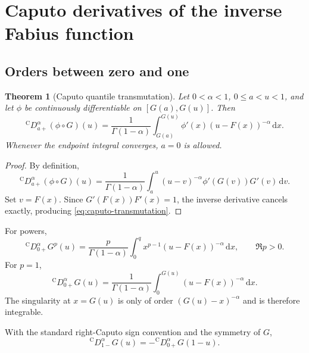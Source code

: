 \documentclass[11pt,oneside]{article}
\newtheorem{theorem}{Theorem}[section]
\theoremstyle{definition}
\theoremstyle{remark}
\newcommand{\dd}{\,\mathrm d}
\newcommand{\Caputo}{\mathrm C}
\begin{document}
\section{Caputo derivatives of the inverse Fabius function}
\label{sec:caputo}

\subsection{Orders between zero and one}

\begin{theorem}[Caputo quantile transmutation]
\label{thm:caputo-transmutation}
Let $0<\alpha<1$, $0\le a<u<1$, and let $\phi$ be continuously
differentiable on $[G(a),G(u)]$.  Then
\begin{equation}
 {}^{\Caputo}D_{a+}^{\alpha}(\phi\circ G)(u)
 =\frac1{\Gamma(1-\alpha)}
  \int_{G(a)}^{G(u)}
  \phi'(x)(u-F(x))^{-\alpha}\dd x.
 \label{eq:caputo-transmutation}
\end{equation}
Whenever the endpoint integral converges, $a=0$ is allowed.
\end{theorem}

\begin{proof}
By definition,
\begin{equation}
 {}^{\Caputo}D_{a+}^{\alpha}(\phi\circ G)(u)
 =\frac1{\Gamma(1-\alpha)}
  \int_a^u(u-v)^{-\alpha}\phi'(G(v))G'(v)\dd v.
\end{equation}
Set $v=F(x)$.  Since $G'(F(x))F'(x)=1$, the inverse derivative cancels
exactly, producing \eqref{eq:caputo-transmutation}.
\end{proof}

For powers,
\begin{equation}
 {}^{\Caputo}D_{0+}^{\alpha}G^p(u)
 =\frac{p}{\Gamma(1-\alpha)}
  \int_0^{q}x^{p-1}(u-F(x))^{-\alpha}\dd x,
 \qquad \Re p>0.
 \label{eq:caputo-powers}
\end{equation}
For $p=1$,
\begin{equation}
 {}^{\Caputo}D_{0+}^{\alpha}G(u)
 =\frac1{\Gamma(1-\alpha)}
  \int_0^{G(u)}(u-F(x))^{-\alpha}\dd x.
 \label{eq:caputo-G}
\end{equation}
The singularity at $x=G(u)$ is only of order $(G(u)-x)^{-\alpha}$ and is
therefore integrable.

With the standard right-Caputo sign convention and the symmetry of $G$,
\begin{equation}
 {}^{\Caputo}D_{1-}^{\alpha}G(u)
 =-{}^{\Caputo}D_{0+}^{\alpha}G(1-u).
 \label{eq:right-left-caputo-symmetry}
\end{equation}
\end{document}
